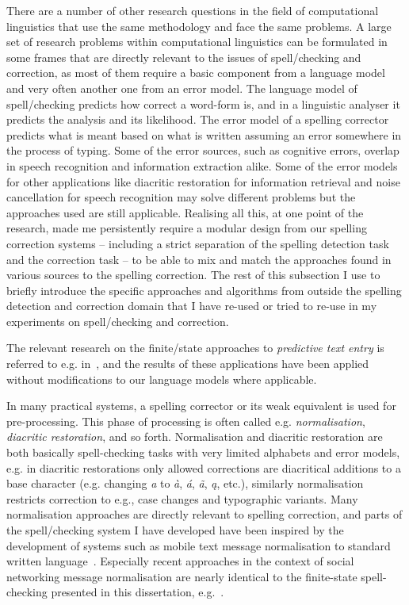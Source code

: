 \documentclass[officiallayout,final]{unihelcompling}
\begin{document}
There are a number of other research questions in the field of computational
linguistics that use the same methodology and face the same problems. A large
set of research problems within computational linguistics can be formulated in
some frames that are directly relevant to the issues of spell\-/checking and
correction, as most of them require a basic component from a language model and
very often another one from an error model. The language model of
spell\-/checking predicts how correct a word-form is, and in a linguistic
analyser it predicts the analysis and its likelihood. The error model of a
spelling corrector predicts what is meant based on what is written assuming an
error somewhere in the process of typing. Some of the error sources, such as
cognitive errors, overlap in speech recognition and information extraction
alike. Some of the error models for other applications like diacritic
restoration for information retrieval and noise cancellation for speech
recognition may solve different problems but the approaches used are still
applicable. Realising all this, at one point of the research, made me
persistently require a modular design from our spelling correction
systems -- including a strict separation of the spelling detection task and the
correction task -- to be able to mix and match the approaches found in various
sources to the spelling correction. The rest of this subsection I use to
briefly introduce the specific approaches and algorithms from outside the
spelling detection and correction domain that I have re-used or tried to
re-use in my experiments on spell\-/checking and correction.

The relevant research on the finite\-/state approaches to \emph{predictive text
entry} is referred to e.g. in~\citet{silfverberg2010partofspeech}, and the
results of these applications have been applied without modifications to our
language models where applicable.

In many practical systems, a spelling corrector or its weak equivalent is used
for pre-processing. This phase of processing is often called e.g.
\emph{normalisation}, \emph{diacritic restoration}, and so forth. Normalisation
and diacritic restoration are both basically spell-checking tasks with very
limited alphabets and error models, e.g. in diacritic restorations only allowed
corrections are diacritical additions to a base character (e.g. changing
\emph{a} to \emph{à}, \emph{á}, \emph{ã}, \emph{ą}, etc.), similarly
normalisation restricts correction to e.g., case changes and typographic
variants.  Many normalisation approaches are directly relevant to spelling
correction, and parts of the spell\-/checking system I have developed have been
inspired by the development of systems such as mobile text message
normalisation to standard written language~\citep{kobus2008normalizing}.
Especially recent approaches in the context of social networking message
normalisation are nearly identical to the finite-state spell-checking presented
in this dissertation, e.g.~\citet{hulden2013weighted}.
\end{document}
